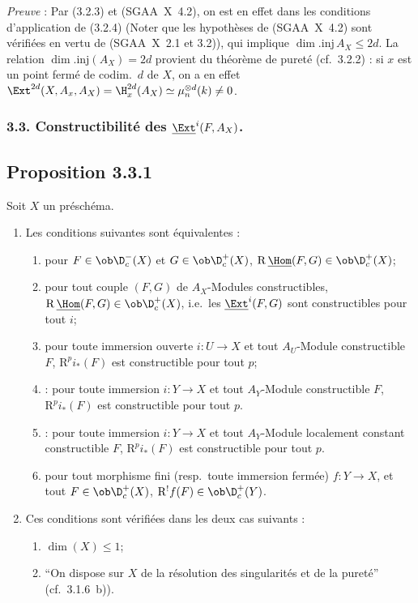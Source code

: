 \emph{Preuve} : Par (3.2.3) et (SGAA~X~4.2), on est en effet dans les conditions d'application de (3.2.4) (Noter que les hypothèses de (SGAA~X~4.2) sont vérifiées en vertu de (SGAA~X~2.1 et 3.2)), qui implique $\dim.\mathrm{inj}\, A_X \leqslant 2d$. La relation $\dim.\mathrm{inj}(A_X) = 2d$ provient du théorème de pureté (cf.~3.2.2) : si $x$ est un point fermé de codim.~$d$ de $X$, on a en effet $\Ext^{2d}(X, A_x, A_X) = \H^{2d}_x(A_X) \simeq \mu_n^{\otimes d}(k) \neq 0$.

\subsubsection*{3.3. Constructibilité des \texorpdfstring{$\underline{\Ext}^i(F, A_X)$}{Ext i(F, A\_X)}.}

\subsection*{Proposition 3.3.1}
Soit $X$ un préschéma.
\begin{enumerate}
\item[a)] Les conditions suivantes sont équivalentes :
\begin{enumerate}
\item[(i)] pour $F \in \ob \D_c^{-}(X)$ et $G \in \ob \D_c^{+}(X)$, $\mathrm{R}\,\underline{\Hom}(F,G) \in \ob \D_c^{+}(X)$;
\item[(i~bis)] pour tout couple $(F,G)$ de $A_X$-Modules constructibles, $\mathrm{R}\,\underline{\Hom}(F,G) \in \ob \D_c^{+}(X)$, i.e.~les $\underline{\Ext}^i(F,G)$ sont constructibles pour tout $i$;
\item[(ii)] pour
toute immersion ouverte $i : U \to X$ et tout $A_U$-Module constructible $F$, $\mathrm{R}^p i_{*}(F)$ est constructible pour tout $p$;
\item[(ii~bis)] : pour toute immersion $i : Y \to X$ et tout $A_Y$-Module constructible $F$, $\mathrm{R}^p i_{*}(F)$ est constructible pour tout $p$.
\item[(ii~ter)] : pour toute immersion $i : Y \to X$ et tout $A_Y$-Module localement constant constructible $F$, $\mathrm{R}^p i_{*}(F)$ est constructible pour tout $p$.
\item[(iii)] pour tout morphisme fini (resp.~toute immersion fermée) $f : Y \to X$, et tout $F \in \ob \D_c^{+}(X)$, $\mathrm{R}^{!}f(F) \in \ob \D_c^{+}(Y)$.
\end{enumerate}
\item[b)] Ces conditions sont vérifiées dans les deux cas suivants :
\begin{enumerate}
\item[(i)] $\dim(X) \leqslant 1$;
\item[(ii)] ``On dispose sur $X$ de la résolution des singularités et de la pureté'' (cf.~3.1.6~b)).
\end{enumerate}
\end{enumerate}

